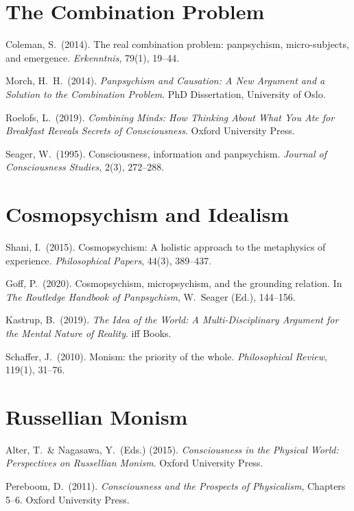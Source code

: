 \documentclass[11pt,a4paper]{report}
\begin{document}
\section*{The Combination Problem}
\begin{enumerate}[label={[\arabic*]}, leftmargin=2.5em, start=11]
  \item Coleman, S.\ (2014). The real combination problem: panpsychism, micro-subjects, and emergence. \textit{Erkenntnis}, 79(1), 19--44.
  \item Morch, H.\ H.\ (2014). \textit{Panpsychism and Causation: A New Argument and a Solution to the Combination Problem}. PhD Dissertation, University of Oslo.
  \item Roelofs, L.\ (2019). \textit{Combining Minds: How Thinking About What You Ate for Breakfast Reveals Secrets of Consciousness}. Oxford University Press.
  \item Seager, W.\ (1995). Consciousness, information and panpsychism. \textit{Journal of Consciousness Studies}, 2(3), 272--288.
\end{enumerate}

\section*{Cosmopsychism and Idealism}
\begin{enumerate}[label={[\arabic*]}, leftmargin=2.5em, start=15]
  \item Shani, I.\ (2015). Cosmopsychism: A holistic approach to the metaphysics of experience. \textit{Philosophical Papers}, 44(3), 389--437.
  \item Goff, P.\ (2020). Cosmopsychism, micropsychism, and the grounding relation. In \textit{The Routledge Handbook of Panpsychism}, W.\ Seager (Ed.), 144--156.
  \item Kastrup, B.\ (2019). \textit{The Idea of the World: A Multi-Disciplinary Argument for the Mental Nature of Reality}. iff Books.
  \item Schaffer, J.\ (2010). Monism: the priority of the whole. \textit{Philosophical Review}, 119(1), 31--76.
\end{enumerate}

\section*{Russellian Monism}
\begin{enumerate}[label={[\arabic*]}, leftmargin=2.5em, start=19]
  \item Alter, T.\ \& Nagasawa, Y.\ (Eds.) (2015). \textit{Consciousness in the Physical World: Perspectives on Russellian Monism}. Oxford University Press.
  \item Pereboom, D.\ (2011). \textit{Consciousness and the Prospects of Physicalism}, Chapters 5--6. Oxford University Press.
\end{enumerate}
\end{document}
